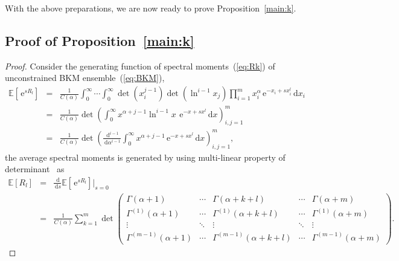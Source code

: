 \documentclass[pdflatex,sn-mathphys-num]{sn-jnl}%
\theoremstyle{thmstyleone}
\newcommand{\dd}{\,\mathrm{d}}
\newcommand{\ee}{\,\mathrm{e}}
\begin{document}
With the above preparations, we are now ready to prove Proposition~\ref{main:k}.

\subsection{Proof of Proposition~\ref{main:k}}\label{sec:P1}
\begin{proof}
Consider the generating function of spectral moments~(\ref{eq:Rk}) of unconstrained BKM ensemble~(\ref{eq:BKM}),
\begin{eqnarray}
\mathbb{E}\left[\ee^{sR_{l}}\right] &=& \frac{1}{C(\alpha)}\int_{0}^{\infty}\!\!\!\!\cdots\!\int_{0}^{\infty}\det\left(x_{i}^{j-1}\right)\det\left(\ln^{i-1}\!x_{j}\right)\prod_{i=1}^{m}x_{i}^{\alpha} \ee^{-x_{i}+sx_{i}^{l}}\dd x_{i} \\
&=& \frac{1}{C(\alpha)}\det\left(\int_{0}^{\infty}\!x^{\alpha+j-1}\ln^{i-1}\!x~\!\ee^{-x+sx^{l}}\dd x\right)_{i,j=1}^{m} \\
&=& \frac{1}{C(\alpha)}\det\left(\frac{\dd^{i-1}}{\dd\alpha^{i-1}}\int_{0}^{\infty}\!x^{\alpha+j-1}\ee^{-x+sx^{l}}\dd x\right)_{i,j=1}^{m},
\end{eqnarray}
the average spectral moments is generated by using multi-linear property of determinant~\cite{Forrester} as
\begin{eqnarray}
\!\!\!\!\!\!\!\!\mathbb{E}\left[R_{l}\right] &=& \frac{\dd}{\dd s}\mathbb{E}\left[\ee^{sR_{l}}\right]\!\bigg|_{s=0} \\
\!\!\!\!\!\!\!\! &=& \frac{1}{C(\alpha)}\sum_{k=1}^{m}\det
\begin{pmatrix}
\Gamma(\alpha+1) & \cdots & \Gamma(\alpha+k+l) &  \cdots & \Gamma(\alpha+m) \\
\Gamma^{(1)}(\alpha+1) & \cdots & \Gamma^{(1)}(\alpha+k+l) & \cdots & \Gamma^{(1)}(\alpha+m) \\
\vdots & \ddots & \vdots & \ddots & \vdots \\
\Gamma^{(m-1)}(\alpha+1) & \cdots & \Gamma^{(m-1)}(\alpha+k+l) & \cdots & \Gamma^{(m-1)}(\alpha+m) \label{eq:Rg}
\end{pmatrix}.
\end{eqnarray}


\end{proof}
\end{document}
